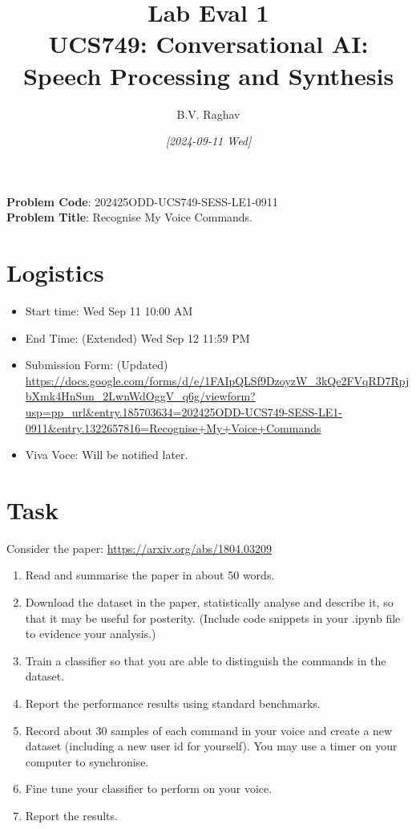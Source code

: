 \documentclass[11pt]{article}
\author{B.V. Raghav}
\date{\textit{[2024-09-11 Wed]}}
\title{Lab Eval 1\\\medskip
\large UCS749: Conversational AI: Speech Processing and Synthesis}
\begin{document}
\maketitle
\noindent \textbf{Problem Code}: 202425ODD-UCS749-SESS-LE1-0911 \\[0pt]
\textbf{Problem Title}: Recognise My Voice Commands.

\section{Logistics}
\label{sec:orgd34df8b}
\begin{itemize}
\item Start time: Wed Sep 11 10:00 AM
\item End Time: (Extended) Wed Sep 12 11:59 PM
\item Submission Form: (Updated) \url{https://docs.google.com/forms/d/e/1FAIpQLSf9DzoyzW\_3kQe2FVqRD7RpjbXmk4HnSun\_2LwnWdOggV\_q6g/viewform?usp=pp\_url\&entry.185703634=202425ODD-UCS749-SESS-LE1-0911\&entry.1322657816=Recognise+My+Voice+Commands}
\item Viva Voce: Will be notified later.
\end{itemize}

\section{Task}
\label{sec:org5b1f750}
Consider the paper: \url{https://arxiv.org/abs/1804.03209}

\begin{enumerate}
\item Read and summarise the paper in about 50 words.
\item Download the dataset in the paper, statistically
analyse and describe it, so that it may be useful
for posterity. (Include code snippets in your .ipynb
file to evidence your analysis.)
\item Train a classifier so that you are able to
distinguish the commands in the dataset.
\item Report the performance results using standard
benchmarks.
\item Record about 30 samples of each command in your
voice and create a new dataset (including a new user
id for yourself).  You may use a timer on your
computer to synchronise.
\item Fine tune your classifier to perform on your voice.
\item Report the results.
\end{enumerate}
\end{document}
